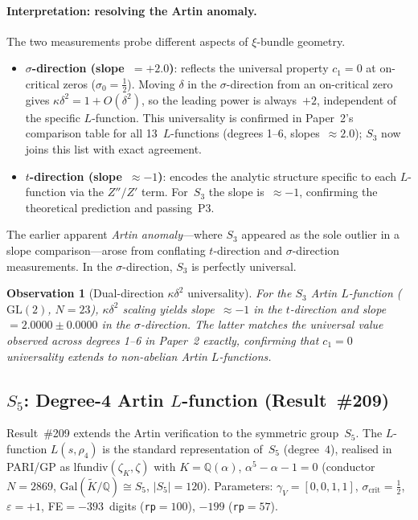 \documentclass[11pt, a4paper]{article}
\theoremstyle{plain}
\newtheorem{observation}[theorem]{Observation}
\theoremstyle{definition}
\newcommand{\kap}{\kappa}             %
\begin{document}
\paragraph{Interpretation: resolving the Artin anomaly.}
The two measurements probe different aspects of $\xi$-bundle geometry.

\begin{itemize}
  \item \textbf{$\sigma$-direction (slope~$=+2.0$)}: reflects the
    universal property $c_{1}=0$ at on-critical zeros
    ($\sigma_{0}=\tfrac{1}{2}$).  Moving $\delta$ in the
    $\sigma$-direction from an on-critical zero gives
    $\kap\delta^{2}=1+O(\delta^{2})$, so the leading power is
    always~$+2$, independent of the specific $L$-function.
    This universality is confirmed in Paper~2's comparison table
    for all 13~$L$-functions (degrees 1--6, slopes~$\approx 2.0$);
    $S_{3}$ now joins this list with exact agreement.
  \item \textbf{$t$-direction (slope~$\approx{-1}$)}: encodes the
    analytic structure specific to each $L$-function via the
    $Z''/Z'$ term.  For~$S_{3}$ the slope is~$\approx{-1}$,
    confirming the theoretical prediction and passing~P3.
\end{itemize}

The earlier apparent \emph{Artin anomaly}---where $S_{3}$ appeared as
the sole outlier in a slope comparison---arose from conflating $t$-direction
and $\sigma$-direction measurements.
In the $\sigma$-direction, $S_{3}$ is perfectly universal.

\begin{observation}[Dual-direction $\kap\delta^{2}$ universality]
\label{obs:bidir}
For the $S_{3}$ Artin $L$-function ($\mathrm{GL}(2)$, $N=23$),
$\kap\delta^{2}$ scaling yields slope~$\approx{-1}$ in the
$t$-direction and slope~$=2.0000\pm0.0000$ in the $\sigma$-direction.
The latter matches the universal value observed across degrees 1--6
in Paper~2 exactly, confirming that $c_{1}=0$ universality extends
to non-abelian Artin $L$-functions.
\end{observation}


\subsection{$S_{5}$: Degree-4 Artin $L$-function (Result~\#209)}
\label{sec:s5-results}

Result~\#209 extends the Artin verification to the symmetric group~$S_{5}$.
The $L$-function $L(s,\rho_4)$ is the standard representation of~$S_{5}$
(degree~$4$), realised in PARI/GP as $\mathrm{lfundiv}(\zeta_K,\zeta)$
with $K=\mathbb{Q}(\alpha)$, $\alpha^{5}-\alpha-1=0$
(conductor $N=2869$, $\mathrm{Gal}(\tilde{K}/\mathbb{Q})\cong S_{5}$,
$|S_{5}|=120$).  Parameters: $\gamma_{V}=[0,0,1,1]$,
$\sigma_{\mathrm{crit}}=\tfrac{1}{2}$, $\varepsilon=+1$,
FE${}=-393$~digits (\texttt{rp}$=100$), $-199$ (\texttt{rp}$=57$).
\end{document}
